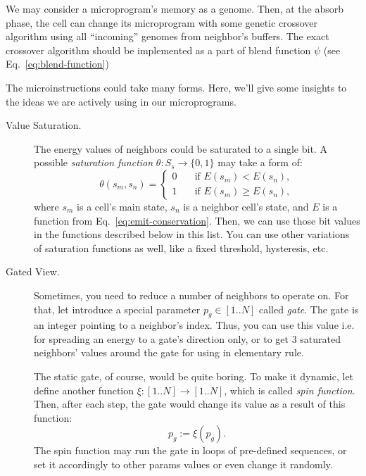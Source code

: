 \documentclass[a4paper,12pt,tikz,UTF8]{article}
\begin{document}
    We may consider a microprogram's memory as a genome. Then, at the absorb phase, the cell can change its microprogram with some genetic crossover algorithm using all ``incoming'' genomes from neighbor's buffers. The exact crossover algorithm should be implemented as a part of blend function $\psi$ (see Eq.~\ref{eq:blend-function})

    The microinstructions could take many forms. Here, we'll give some insights to the ideas we are actively using in our microprograms.
    \begin{description}
      \item [Value Saturation.] The energy values of neighbors could be saturated to a single bit. A possible \textit{saturation function} $\theta: S_s \to \{ 0, 1 \}$ may take a form of:
        \begin{equation}
          \theta(s_m, s_n) = 
          \begin{cases}
            0 \quad & \text{if } E(s_m) < E(s_n),\\
            1 \quad & \text{if } E(s_m) \geq E(s_n),
          \end{cases}
        \end{equation}
        where $s_m$ is a cell's main state, $s_n$ is a neighbor cell's state, and $E$ is a function from Eq.~\ref{eq:emit-conservation}. Then, we can use those bit values in the functions described below in this list. You can use other variations of saturation functions as well, like a fixed threshold, hysteresis, etc.
      \item [Gated View.] Sometimes, you need to reduce a number of neighbors to operate on. For that, let introduce a special parameter $p_g \in {[1 .. N]}$ called \textit{gate}. The gate is an integer pointing to a neighbor's index. Thus, you can use this value i.e. for spreading an energy to a gate's direction only, or to get 3 saturated neighbors' values around the gate for using in elementary rule.
        
        The static gate, of course, would be quite boring. To make it dynamic, let define another function $\xi: {[1 .. N]} \to {[1 .. N]}$, which is called \textit{spin function}. Then, after each step, the gate would change its value as a result of this function:
        \begin{equation}
          p_g := \xi(p_g).
        \end{equation}
        The spin function may run the gate in loops of pre-defined sequences, or set it accordingly to other params values or even change it randomly.


\end{description}
\end{document}
